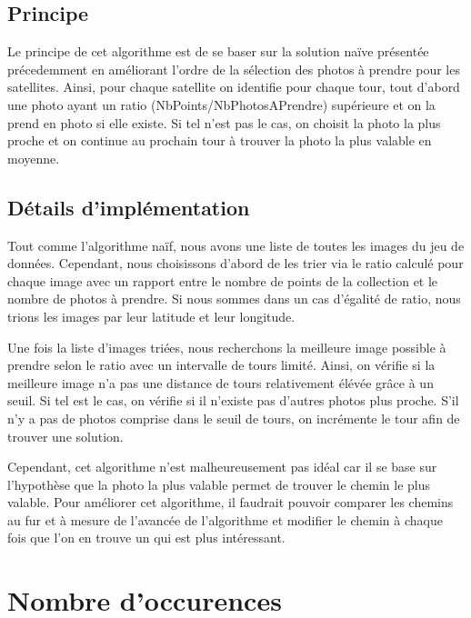\documentclass[11pt]{article}
\begin{document}
		\subsection{Principe}
		
		Le principe de cet algorithme est de se baser sur la solution naïve présentée précedemment en améliorant l'ordre de la sélection des photos à prendre pour les satellites. Ainsi, pour chaque satellite on identifie pour chaque tour, tout d'abord une photo ayant un ratio (NbPoints/NbPhotosAPrendre) supérieure et on la prend en photo si elle existe. Si tel n'est pas le cas, on choisit la photo la plus proche et on continue au prochain tour à trouver la photo la plus valable en moyenne.
		
		\subsection{Détails d'implémentation}
		
		Tout comme l'algorithme naïf, nous avons une liste de toutes les images du jeu de données. Cependant, nous choisissons d'abord de les trier via le ratio calculé pour chaque image avec un rapport entre le nombre de points de la collection et le nombre de photos à prendre. Si nous sommes dans un cas d'égalité de ratio, nous trions les images par leur latitude et leur longitude.
		
		Une fois la liste d'images triées, nous recherchons la meilleure image possible à prendre selon le ratio avec un intervalle de tours limité. Ainsi, on vérifie si la meilleure image n'a pas une distance de tours relativement élévée grâce à un seuil. Si tel est le cas, on vérifie si il n'existe pas d'autres photos plus proche. S'il n'y a pas de photos comprise dans le seuil de tours, on incrémente le tour afin de trouver une solution.
		
		Cependant, cet algorithme n'est malheureusement pas idéal car il se base sur l'hypothèse que la photo la plus valable permet de trouver le chemin le plus valable. Pour améliorer cet algorithme, il faudrait pouvoir comparer les chemins au fur et à mesure de l'avancée de l'algorithme et modifier le chemin à chaque fois que l'on en trouve un qui est plus intéressant. 


	\section{Nombre d'occurences} %
	\label{sec:encore_un_autre_algorithme}
\end{document}
